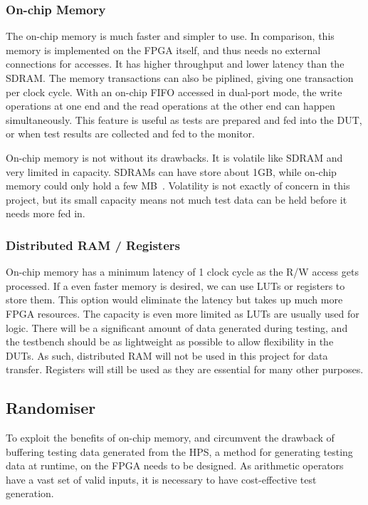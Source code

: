 \subsubsection{\textbf{On-chip Memory}}
The on-chip memory is much faster and simpler to use.
In comparison, this memory is implemented on the FPGA itself, and thus needs no external connections for accesses.
It has higher throughput and lower latency than the SDRAM.
The memory transactions can also be piplined, giving one transaction per clock cycle.
With an on-chip FIFO accessed in dual-port mode, the write operations at one end and the read operations at the other end can happen simultaneously.
This feature is useful as tests are prepared and fed into the DUT, or when test results are collected and fed to the monitor.

On-chip memory is not without its drawbacks.
It is volatile like SDRAM and very limited in capacity.
SDRAMs can have store about 1GB, while on-chip memory could only hold a few MB~\cite{Altera2}.
Volatility is not exactly of concern in this project, but its small capacity means not much test data can be held before it needs more fed in.

\subsubsection{\textbf{Distributed RAM / Registers}}
On-chip memory has a minimum latency of 1 clock cycle as the R/W access gets processed.
If a even faster memory is desired, we can use LUTs or registers to store them.
This option would eliminate the latency but takes up much more FPGA resources.
The capacity is even more limited as LUTs are usually used for logic.
There will be a significant amount of data generated during testing, and the testbench should be as lightweight as possible to allow flexibility in the DUTs.
As such, distributed RAM will not be used in this project for data transfer.
Registers will still be used as they are essential for many other purposes.

\subsection{Randomiser}
To exploit the benefits of on-chip memory, and circumvent the drawback of buffering testing data generated from the HPS, a method for generating testing data at runtime, on the FPGA needs to be designed.
As arithmetic operators have a vast set of valid inputs, it is necessary to have cost-effective test generation.

